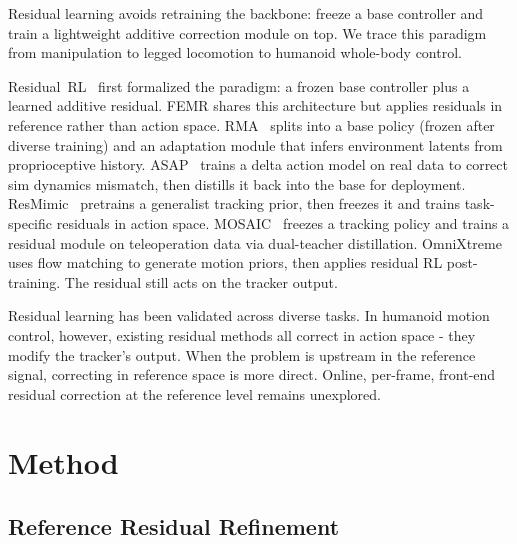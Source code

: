 \documentclass{article}
\begin{document}

	Residual learning avoids retraining the backbone: freeze a base controller and train a lightweight additive correction module on top. We trace this paradigm from manipulation to legged locomotion to humanoid whole-body control.
	
	Residual~RL~\cite{johannink2019residual} first formalized the paradigm: a frozen base controller plus a learned additive residual. FEMR shares this architecture but applies residuals in reference rather than action space. RMA~\cite{kumar2021rma} splits into a base policy (frozen after diverse training) and an adaptation module that infers environment latents from proprioceptive history. ASAP~\cite{asap2025} trains a delta action model on real data to correct sim dynamics mismatch, then distills it back into the base for deployment. ResMimic~\cite{resmimic2025} pretrains a generalist tracking prior, then freezes it and trains task-specific residuals in action space. MOSAIC~\cite{mosaic2026} freezes a tracking policy and trains a residual module on teleoperation data via dual-teacher distillation. OmniXtreme~\cite{omnixtreme2026} uses flow matching to generate motion priors, then applies residual RL post-training. The residual still acts on the tracker output.

	Residual learning has been validated across diverse tasks. In humanoid motion control, however, existing residual methods all correct in action space - they modify the tracker's output. When the problem is upstream in the reference signal, correcting in reference space is more direct. Online, per-frame, front-end residual correction at the reference level remains unexplored.


\section{Method}

\subsection{Reference Residual Refinement}

\end{document}
